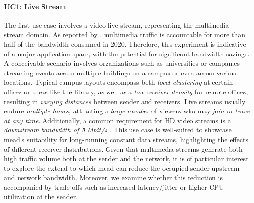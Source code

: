 \paragraph{UC1: Live Stream} %
\label{par:EX1: Live Stream}
The first use case involves a video live stream, representing the multimedia
    stream domain.
As reported by \citeauthor{cartesian_us_bw} \cite{cartesian_us_bw}, multimedia 
    traffic is accountable for more than half of the bandwidth consumed in
    2020.
Therefore, this experiment is indicative of a major application space, with the
    potential for significant bandwidth savings.
A conceivable scenario involves organizations such as universities or companies
    streaming events across multiple buildings on a campus or even across
    various locations.
Typical campus layouts encompass both \textit{local clustering} at certain
    offices or areas like the library, as well as a \textit{low receiver
    density} for remote offices, resulting in \textit{varying distances}
    between sender and receivers.
Live streams usually endure \textit{multiple hours}, attracting a \textit{large
    number} of viewers who may \textit{join or leave at any time}.
Additionally, a common requirement for HD video streams is a \textit{downstream
    bandwidth of 5 Mbit/s} \cite{cartesian_us_bw}.
This use case is well-suited to showcase \gls{mead}'s suitability for
    long-running constant data streams, highlighting the effects of different
    receiver distributions.
Given that multimedia streams generate both high traffic volume both at the
    sender and the network, it is of particular interest to explore the extend
    to which \gls{mead} can reduce the occupied sender upstream and network
    bandwidth.
Moreover, we examine whether this reduction is accompanied by trade-offs
    such as increased latency/jitter or higher CPU utilization at the sender.

